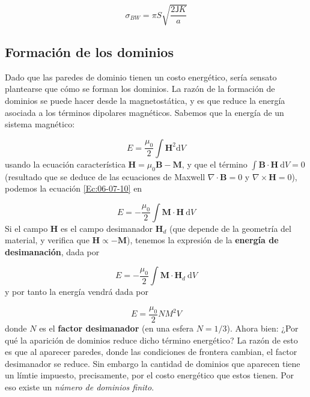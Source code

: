 \documentclass[12pt,a4paper]{book}
\numberwithin{equation}{section}
\numberwithin{figure}{section}
\newcommand{\D}{\mathrm{d}}
\newcommand{\Jsf}{\mathsf{J}}
\newcommand{\Bn}{\mathbf{B}}
\newcommand{\Hn}{\mathbf{H}}
\newcommand{\Mn}{\mathbf{M}}
\begin{document}
\begin{equation}
    \sigma_{BW} = \pi S\sqrt{\frac{2 \Jsf K}{a}}
\end{equation}

\subsection{Formación de los dominios}

Dado que las paredes de dominio tienen un costo energético, sería sensato plantearse que cómo se forman los dominios. La razón de la formación de dominios se puede hacer desde la magnetostática, y es que reduce la energía asociada a los términos dipolares magnéticos. Sabemos que la energía de un sistema magnético:

\begin{equation}
    E = \frac{\mu_0}{2} \int \Hn^2  \D V \label{Ec:06-07-10}
\end{equation} 
usando la ecuación característica $\Hn = \mu_0 \Bn - \Mn$, y que el término $\int \Bn \cdot \Hn \ \D V=0$ (resultado que se deduce de las ecuaciones de Maxwell $\nabla \cdot \Bn = 0$ y $\nabla \times \Hn = 0$), podemos la ecuación \ref{Ec:06-07-10} en 

\begin{equation}
    E = - \frac{\mu_0}{2} \int \Mn \cdot \Hn \ \D V
\end{equation}
Si el campo $\Hn$ es el campo desimanador $\Hn_d$ (que depende de la geometría del material, y verifica que $\Hn \varpropto - \Mn$), tenemos la expresión de la \textbf{energía de desimanación}, dada por

\begin{equation}
    E = - \frac{\mu_0}{2} \int \Mn \cdot \Hn_d \ \D V
\end{equation}
y por tanto la energía vendrá dada por

\begin{equation}
    E =\frac{\mu_0}{2} N M^2 V
\end{equation}
donde $N$ es el \textbf{factor desimanador} (en una esfera $N=1/3$). Ahora bien: ¿Por qué la aparición de dominios reduce dicho término energético? La razón de esto es que al aparecer paredes, donde las condiciones de frontera cambian, el factor desimanador se reduce. Sin embargo la cantidad de dominios que aparecen tiene un límtie impuesto, precisamente, por el costo energético que estos tienen. Por eso existe un \textit{número de dominios finito}. 
\end{document}
